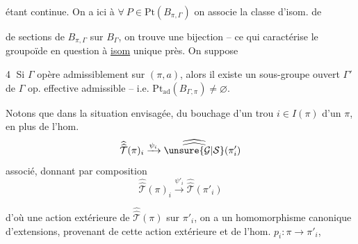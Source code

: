 étant continue. On a ici  à $\forall\ P\in\mathrm{Pt}(B_{\pi,\Gamma})$ on associe la classe d'isom. de 

 de sections de $B_{\pi,\Gamma}$ sur $B_\Gamma$, on trouve une bijection -- ce qui caractérise le \inserted{$\Gamma$-}groupoïde en question à \uline{isom} unique près. On suppose

\textcircled{4} Si $\Gamma$ opère admissiblement sur $(\pi,a)$, alors il existe un sous-groupe ouvert $\Gamma'$ de $\Gamma$   op. effective admissible -- i.e. $\mathrm{Pt}_{\mathrm{ad}}(B_{\Gamma,\pi})\ne\varnothing$.


Notons que dans la situation envisagée, du bouchage d'un trou $i\in I(\pi)$ d'un $\pi$, en plus de l'hom.
\[
\widehat{\widehat{\mathcal T}}(\pi)_i
\xrightarrow{\psi_i}
\widehat{\widehat{\unsure{\mathcal G|\mathcal S}}}(\pi'_i)
\]
associé, donnant par composition
\[
\widehat{\widehat{\mathcal T}}(\pi)_i
\xrightarrow{\psi'_i}
\widehat{\widehat{\mathcal T}}(\pi'_i)
\]

d'où une action extérieure de $\widehat{\widehat{\mathcal T}}(\pi)$ sur $\pi'_i$,  on a un homomorphisme canonique d'extensions,  provenant de cette action extérieure et de l'hom. $p_i:\pi\longrightarrow\pi'_i$,

